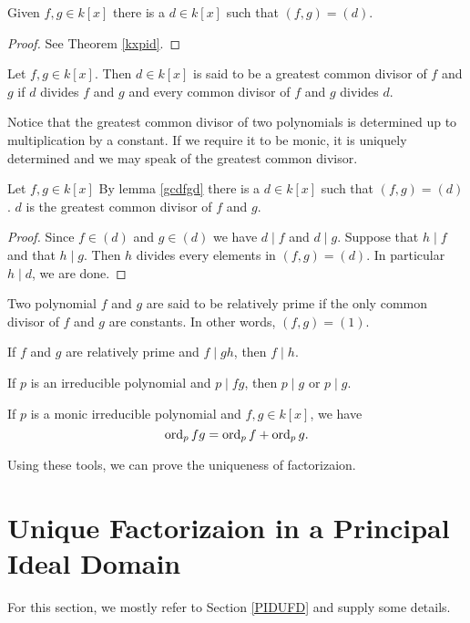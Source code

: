 \documentclass{mynotes}
\begin{document}
\begin{lemma}\label{gcdfgd}
Given $f,g\in k[x]$ there is a $d\in k[x]$ such that $(f,g)=(d)$.
\end{lemma}
\begin{proof}
See Theorem \ref{kxpid}.
\end{proof}
\begin{definition}
Let $f,g\in k[x]$. Then $d\in k[x]$ is said to be a greatest common divisor of $f$ and $g$ if $d$ divides $f$ and $g$ and every common divisor of $f$ and $g$ divides $d$.
\end{definition}
\begin{remark}
Notice that the greatest common divisor of two polynomials is determined up to multiplication by a constant. If we require it to be monic, it is uniquely determined and we may speak of the greatest common divisor.
\end{remark}
\begin{lemma}
Let $f,g\in k[x]$ By lemma \ref{gcdfgd} there is a $d\in k[x]$ such that $(f,g)=(d)$. $d$ is the greatest common divisor of $f$ and $g$.
\end{lemma}
\begin{proof}
Since $f\in (d)$ and $g\in(d)$ we have $d\mid f$ and $d\mid g$. Suppose that $h\mid f$ and that $h\mid g$. Then $h$ divides every elements in $(f,g)=(d)$. In particular $h\mid d$, we are done.
\end{proof}
\begin{definition}
Two polynomial $f$ and $g$ are said to be relatively prime if the only common divisor of $f$ and $g$ are constants. In other words, $(f,g) = (1)$.
\end{definition}
\begin{proposition}
If $f$ and $g$ are relatively prime and $f\mid gh$, then $f\mid h$.
\end{proposition}
\begin{corollary}
If $p$ is an irreducible polynomial and $p\mid fg$, then $p\mid g$ or $p\mid g$. 
\end{corollary}
\begin{corollary}
If $p$ is a monic irreducible polynomial and $f,g\in k[x]$, we have $$\mbox{ord}_{p}\,fg=\mbox{ord}_{p}\,f+\mbox{ord}_{p}\,g.$$
\end{corollary}
Using these tools, we can prove the uniqueness of factorizaion.
\section{Unique Factorizaion in a Principal Ideal Domain}
For this section, we mostly refer to Section \ref{PIDUFD} and supply some details. 
\end{document}
